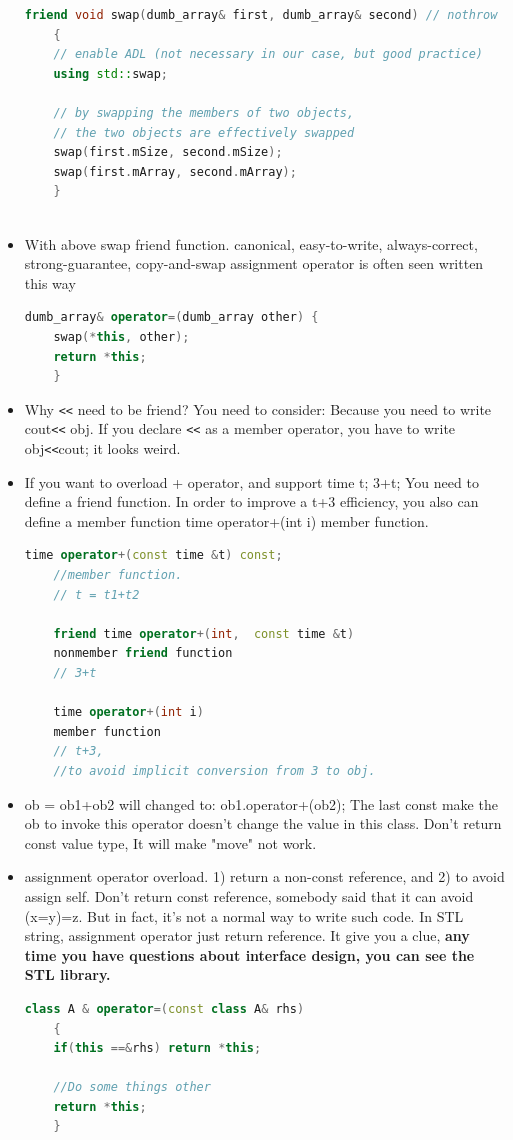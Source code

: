 \documentclass[a4paper,12pt,twoside]{book}
\begin{document}
\begin{itemize}
\begin{lstlisting}[frame=single, language=c++, mathescape=true]
	friend void swap(dumb_array& first, dumb_array& second) // nothrow
	{
	// enable ADL (not necessary in our case, but good practice)
	using std::swap;
	
	// by swapping the members of two objects,
	// the two objects are effectively swapped
	swap(first.mSize, second.mSize);
	swap(first.mArray, second.mArray);
	}
	
	\end{lstlisting}
	
	\item With above swap friend function. canonical, easy-to-write, always-correct, strong-guarantee, copy-and-swap assignment operator is often seen written this way
	\begin{lstlisting}[frame=single, language=c++, mathescape=true]
	dumb_array& operator=(dumb_array other) {
	swap(*this, other);
	return *this;
	}
	\end{lstlisting}

	\item Why \verb=<<= need to be friend? You need to consider:  Because you need to write cout\verb=<<= obj. If you declare \verb=<<= as a member operator, you have to write obj\verb=<<=cout; it looks weird.
	
	\item If you want to overload + operator, and support time t; 3+t;   You need to define a friend function. In order to improve a t+3 efficiency, you also can define a member function time operator+(int i) member function.
	\begin{lstlisting}[frame=single, language=c++]
	time operator+(const time &t) const;
	//member function.
	// t = t1+t2
	
	friend time operator+(int,  const time &t)
	nonmember friend function
	// 3+t
	
	time operator+(int i)
	member function
	// t+3,
	//to avoid implicit conversion from 3 to obj.
	\end{lstlisting}
	
	\item ob = ob1+ob2 will changed to:  ob1.operator+(ob2);  The last const make the ob to invoke this operator doesn't change the value in this class. Don't return const value type, It will make "move" not work.
	
	
	\item assignment operator overload. 1) return a non-const reference, and 2) to avoid assign self. Don't return const reference, somebody said that it can avoid (x=y)=z. But in fact, it's not a normal way to write such code. In STL string, assignment operator just return reference. It give you a clue, \textbf{any time you have questions about interface design, you can see the STL library.}
	\begin{lstlisting}[frame=single, language=c++]
	class A & operator=(const class A& rhs)
	{
	if(this ==&rhs) return *this;
	
	//Do some things other
	return *this;
	}
	\end{lstlisting}
	




\end{itemize}
\end{document}
